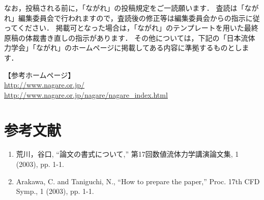 \documentclass[a4j]{jarticle}
\begin{document}
なお，投稿される前に，「ながれ」の投稿規定をご一読願います．
査読は「ながれ」編集委員会で行われますので，査読後の修正等は編集委員会からの指示に従ってください．
掲載可となった場合は，「ながれ」のテンプレートを用いた最終原稿の体裁書き直しの指示があります．
その他については，下記の「日本流体力学会」「ながれ」のホームページに掲載してある内容に準拠するものとします．

\noindent
【参考ホームページ】\\
\url{http://www.nagare.or.jp/} \\
\url{http://www.nagare.or.jp/nagare/nagare_index.html}

\section*{参考文献}

\begin{enumerate}
    \item 荒川，谷口, ``論文の書式について,'' 第17回数値流体力学講演論文集, 1 (2003), pp. 1-1.
    \item Arakawa, C. and Taniguchi, N., ``How to prepare the paper,'' Proc. 17th CFD Symp., 1 (2003), pp. 1-1.
\end{enumerate}
\end{document}
